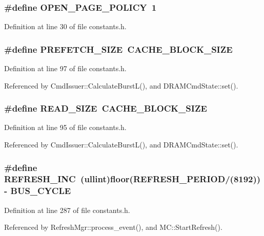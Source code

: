 \subsubsection[{OPEN\_\-PAGE\_\-POLICY}]{\setlength{\rightskip}{0pt plus 5cm}\#define OPEN\_\-PAGE\_\-POLICY~1}\label{constants_8h_4ab10c9656ea1507d1714d591563fb0d}




Definition at line 30 of file constants.h.
\subsubsection[{PREFETCH\_\-SIZE}]{\setlength{\rightskip}{0pt plus 5cm}\#define PREFETCH\_\-SIZE~CACHE\_\-BLOCK\_\-SIZE}\label{constants_8h_9c2cf5515858ee2f97a157ca23de784f}




Definition at line 97 of file constants.h.

Referenced by CmdIssuer::CalculateBurstL(), and DRAMCmdState::set().
\subsubsection[{READ\_\-SIZE}]{\setlength{\rightskip}{0pt plus 5cm}\#define READ\_\-SIZE~CACHE\_\-BLOCK\_\-SIZE}\label{constants_8h_86e1969b50e55e5d506233078ca0fa4c}




Definition at line 95 of file constants.h.

Referenced by CmdIssuer::CalculateBurstL(), and DRAMCmdState::set().
\subsubsection[{REFRESH\_\-INC}]{\setlength{\rightskip}{0pt plus 5cm}\#define REFRESH\_\-INC~({\bf ullint})floor(REFRESH\_\-PERIOD/(8192)) - BUS\_\-CYCLE}\label{constants_8h_aebf6da1474d52a416fbf00608e500cd}




Definition at line 287 of file constants.h.

Referenced by RefreshMgr::process\_\-event(), and MC::StartRefresh().
